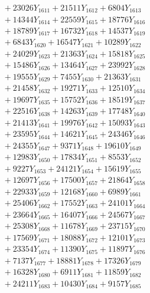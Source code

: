 \documentclass[a4paper,10pt]{article}
\begin{document}
{\begin{align}
&\;  + 23026 Y_{1611} + 21511 Y_{1612} + 6804 Y_{1613} \\[0.3ex]
&\;  + 14344 Y_{1614} + 22559 Y_{1615} + 18776 Y_{1616} \\[0.3ex]
&\;  + 18789 Y_{1617} + 16732 Y_{1618} + 14537 Y_{1619} \\[0.5ex]\allowbreak
&\;  + 6843 Y_{1620} + 16547 Y_{1621} + 10289 Y_{1622} \\[0.3ex]
&\;  + 24029 Y_{1623} + 21363 Y_{1624} + 15818 Y_{1625} \\[0.3ex]
&\;  + 15486 Y_{1626} + 13464 Y_{1627} + 23992 Y_{1628} \\[0.3ex]
&\;  + 19555 Y_{1629} + 7455 Y_{1630} + 21363 Y_{1631} \\[0.3ex]
&\;  + 21458 Y_{1632} + 19271 Y_{1633} + 12510 Y_{1634} \\[0.3ex]
&\;  + 19697 Y_{1635} + 15752 Y_{1636} + 18519 Y_{1637} \\[0.3ex]
&\;  + 22516 Y_{1638} + 14263 Y_{1639} + 17748 Y_{1640} \\[0.3ex]
&\;  + 21413 Y_{1641} + 19976 Y_{1642} + 15093 Y_{1643} \\[0.3ex]
&\;  + 23595 Y_{1644} + 14621 Y_{1645} + 24346 Y_{1646} \\[0.3ex]
&\;  + 24355 Y_{1647} + 9371 Y_{1648} + 19610 Y_{1649} \\[0.5ex]\allowbreak
&\;  + 12983 Y_{1650} + 17834 Y_{1651} + 8553 Y_{1652} \\[0.3ex]
&\;  + 9227 Y_{1653} + 24121 Y_{1654} + 15619 Y_{1655} \\[0.3ex]
&\;  + 12697 Y_{1656} + 17500 Y_{1657} + 21864 Y_{1658} \\[0.3ex]
&\;  + 22933 Y_{1659} + 12168 Y_{1660} + 6989 Y_{1661} \\[0.3ex]
&\;  + 25406 Y_{1662} + 17552 Y_{1663} + 24101 Y_{1664} \\[0.3ex]
&\;  + 23664 Y_{1665} + 16407 Y_{1666} + 24567 Y_{1667} \\[0.3ex]
&\;  + 25308 Y_{1668} + 11678 Y_{1669} + 23715 Y_{1670} \\[0.3ex]
&\;  + 17569 Y_{1671} + 18088 Y_{1672} + 12101 Y_{1673} \\[0.3ex]
&\;  + 23354 Y_{1674} + 11390 Y_{1675} + 11897 Y_{1676} \\[0.3ex]
&\;  + 7137 Y_{1677} + 18881 Y_{1678} + 17326 Y_{1679} \\[0.5ex]\allowbreak
&\;  + 16328 Y_{1680} + 6911 Y_{1681} + 11859 Y_{1682} \\[0.3ex]
&\;  + 24211 Y_{1683} + 10430 Y_{1684} + 9157 Y_{1685} \\[0.3ex]

\end{align}}
\end{document}
